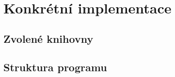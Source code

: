 








\section{Konkrétní implementace}

\subsection{Zvolené knihovny}

\subsection{Struktura programu}













